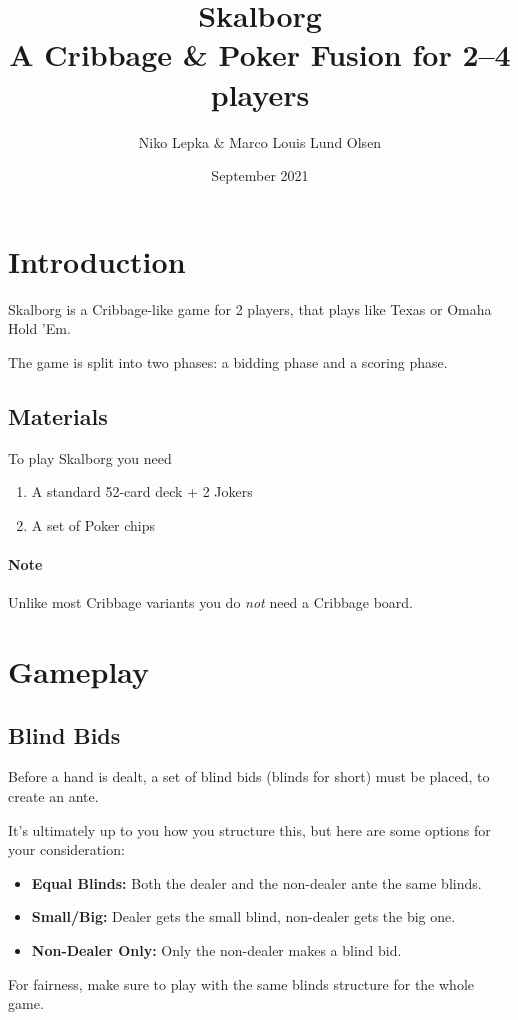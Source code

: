 \documentclass{article}
\title{%
Skalborg\\
\normalsize A Cribbage \& Poker Fusion for 2--4 players}
\author{Niko Lepka \& Marco Louis Lund Olsen}
\date{September 2021}
\begin{document}
\maketitle

\newcommand{\name}{Skalborg}
\newcommand{\note}{\paragraph{Note}}
\newcommand{\example}{\paragraph{Example}}

\section{Introduction}

\name{} is a Cribbage-like game for 2 players, that plays like Texas or Omaha Hold 'Em.

The game is split into two phases: a bidding phase and a scoring phase. 

\subsection{Materials}
To play \name{} you need

\begin{enumerate}
    \item A standard 52-card deck + 2 Jokers
    \item A set of Poker chips
\end{enumerate}

\note Unlike most Cribbage variants you do \textit{not} need a Cribbage board.

\section{Gameplay}

\subsection{Blind Bids}
Before a hand is dealt, a set of blind bids (blinds for short) must be placed, to create an ante.

It's ultimately up to you how you structure this, but here are some options for your consideration:
\begin{itemize}
    \item \textbf{Equal Blinds:} Both the dealer and the non-dealer ante the same blinds.
    \item \textbf{Small/Big:} Dealer gets the small blind, non-dealer gets the big one.
    \item \textbf{Non-Dealer Only:} Only the non-dealer makes a blind bid.
\end{itemize}
For fairness, make sure to play with the same blinds structure for the whole game.
\end{document}
